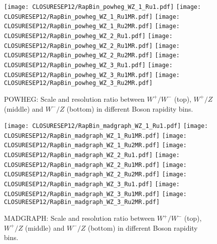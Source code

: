 \documentclass[41pt,a4paper,oneside]{report}
\begin{document}
\begin{figure}[h!]
  \begin{center}
    \texttt{[image: CLOSURESEP12/RapBin\_powheg\_WZ\_1\_Ru1.pdf]}
    \texttt{[image: CLOSURESEP12/RapBin\_powheg\_WZ\_1\_Ru1MR.pdf]}
    \texttt{[image: CLOSURESEP12/RapBin\_powheg\_WZ\_1\_Ru2MR.pdf]}
    \texttt{[image: CLOSURESEP12/RapBin\_powheg\_WZ\_2\_Ru1.pdf]}
    \texttt{[image: CLOSURESEP12/RapBin\_powheg\_WZ\_2\_Ru1MR.pdf]}
    \texttt{[image: CLOSURESEP12/RapBin\_powheg\_WZ\_2\_Ru2MR.pdf]}
    \texttt{[image: CLOSURESEP12/RapBin\_powheg\_WZ\_3\_Ru1.pdf]}
    \texttt{[image: CLOSURESEP12/RapBin\_powheg\_WZ\_3\_Ru1MR.pdf]}
    \texttt{[image: CLOSURESEP12/RapBin\_powheg\_WZ\_3\_Ru2MR.pdf]}
    \caption{POWHEG: Scale and resolution ratio between $W^{+}/W^{-}$ (top), $W^{+}/Z$ (middle) and $W^{-}/Z$ (bottom) in different Boson rapidity bins.}
    \label{fig:RapBinningPOW}
  \end{center}
\end{figure}

\begin{figure}[h!]
  \begin{center}
    \texttt{[image: CLOSURESEP12/RapBin\_madgraph\_WZ\_1\_Ru1.pdf]}
    \texttt{[image: CLOSURESEP12/RapBin\_madgraph\_WZ\_1\_Ru1MR.pdf]}
    \texttt{[image: CLOSURESEP12/RapBin\_madgraph\_WZ\_1\_Ru2MR.pdf]}
    \texttt{[image: CLOSURESEP12/RapBin\_madgraph\_WZ\_2\_Ru1.pdf]}
    \texttt{[image: CLOSURESEP12/RapBin\_madgraph\_WZ\_2\_Ru1MR.pdf]}
    \texttt{[image: CLOSURESEP12/RapBin\_madgraph\_WZ\_2\_Ru2MR.pdf]}
    \texttt{[image: CLOSURESEP12/RapBin\_madgraph\_WZ\_3\_Ru1.pdf]}
    \texttt{[image: CLOSURESEP12/RapBin\_madgraph\_WZ\_3\_Ru1MR.pdf]}
    \texttt{[image: CLOSURESEP12/RapBin\_madgraph\_WZ\_3\_Ru2MR.pdf]}
    \caption{MADGRAPH: Scale and resolution ratio between $W^{+}/W^{-}$ (top), $W^{+}/Z$ (middle) and $W^{-}/Z$ (bottom) in different Boson rapidity bins.}
    \label{fig:RapBinningMAD}
  \end{center}
\end{figure}
\end{document}

